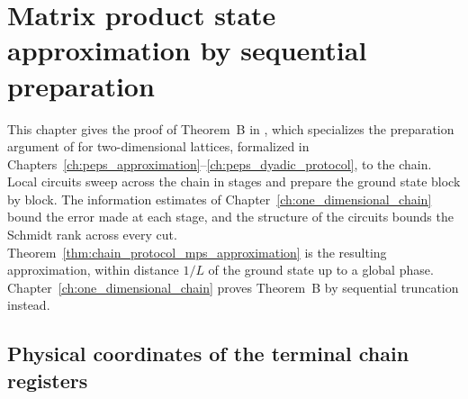 \chapter{Matrix product state approximation by sequential preparation}
\label{ch:one_dimensional_protocol}

This chapter gives the proof of Theorem~B in
\cite[Part~II]{TNLean2026OneDimensional}, which specializes the preparation
argument of \cite{OpenAI2026PolynomialPEPS} for two-dimensional lattices,
formalized in
Chapters~\ref{ch:peps_approximation}--\ref{ch:peps_dyadic_protocol}, to the
chain. Local circuits sweep across the chain in stages and prepare the
ground state block by block. The information estimates of
Chapter~\ref{ch:one_dimensional_chain} bound the error made at each stage,
and the structure of the circuits bounds the Schmidt rank across every cut.
Theorem~\ref{thm:chain_protocol_mps_approximation} is the resulting
approximation, within distance $1/L$ of the ground state up to a global
phase. Chapter~\ref{ch:one_dimensional_chain} proves Theorem~B by sequential
truncation instead.

\section{Physical coordinates of the terminal chain registers}

